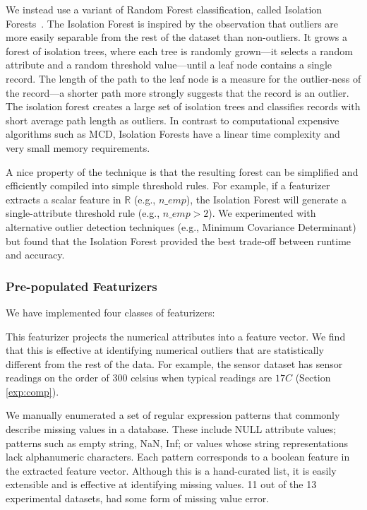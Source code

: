 We instead use a variant of Random Forest classification, called Isolation Forests~\cite{liu2008isolation}.  The Isolation Forest is inspired by the observation that outliers are more easily separable from the rest of the dataset than non-outliers.  It grows a forest of isolation trees, where each tree is randomly grown---it selects a random attribute and a random threshold value---until a leaf node contains a single record.  The length of the path to the leaf node is a measure for the outlier-ness of the record---a shorter path more strongly suggests that the record is an outlier.  The isolation forest creates a large set of isolation trees and classifies records with short average path length as outliers.  In contrast to computational expensive algorithms such as MCD, Isolation Forests have a linear time complexity and very small memory requirements.  

A nice property of the technique is that the resulting forest can be simplified and efficiently compiled into simple threshold rules. 
For example, if a featurizer extracts a scalar feature in $\mathbb{R}$ (e.g., $n\_emp$), the Isolation Forest will generate a single-attribute threshold rule (e.g., $n\_emp > 2$).  
 We experimented with alternative outlier detection techniques (e.g., Minimum Covariance Determinant) but found that the Isolation Forest provided the best trade-off between runtime and accuracy.

\subsubsection{Pre-populated Featurizers}

We have implemented four classes of featurizers:


 This featurizer projects the numerical attributes into a feature vector.  We find that this is effective at identifying numerical outliers that are statistically different from the rest of the data. For example, the sensor dataset has sensor readings on the order of $300$ celsius when typical readings are $17C$ (Section \ref{exp:comp}).

  We manually enumerated a set of regular expression patterns that commonly describe missing values in a database.  These include \textsf{NULL} attribute values; patterns such as empty string, NaN, Inf; or values whose string representations lack alphanumeric characters. Each pattern corresponds to a boolean feature in the extracted feature vector.   Although this is a hand-curated list, it is easily extensible and is effective at identifying missing values. 11 out of the 13 experimental datasets, had some form of missing value error.

